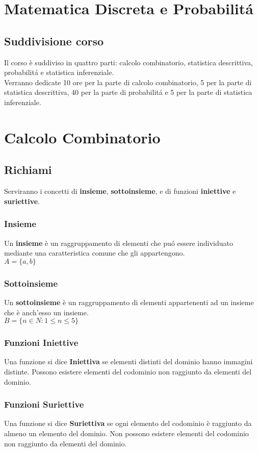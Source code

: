 \documentclass[11pt]{article}
\begin{document}
    \section*{\huge \centering Matematica Discreta e Probabilit\'a }
     \subsection*{Suddivisione corso} 
        Il corso \`e suddiviso in quattro parti: calcolo combinatorio,
        statistica descrittiva, probabilit\'a e statistica inferenziale. \\
        Verranno dedicate 10 ore per la parte di calcolo combinatorio, 5 
        per la parte di statistica descrittiva, 40 per la parte di probabilit\'a e 5 per la parte di statistica inferenziale.
   
   \section{Calcolo Combinatorio}
    \subsection{Richiami}
        Serviranno i concetti di \textbf{insieme},\textbf{ sottoinsieme}, e di funzioni \textbf{iniettive} e \textbf{suriettive}.
        \subsubsection{Insieme}
            Un \textbf{insieme} \`e un raggruppamento di elementi che pu\'o essere individuato mediante una caratteristica comune che gli appartengono.\\
            $A=\{a,b\}$
        \subsubsection{Sottoinsieme}
            Un \textbf{sottoinsieme} \`e un raggruppamento di elementi appartenenti ad un insieme che \`e anch'esso un insieme.\\
            $B=\{n \in N : 1\leq n \leq 5 \} $ 
        \subsubsection{Funzioni Iniettive}
            Una funzione si dice \textbf{Iniettiva} se elementi distinti del dominio hanno immagini distinte. Possono esistere elementi del codominio non raggiunto da elementi del dominio.
        \subsubsection{Funzioni Suriettive}
            Una funzione si dice \textbf{Suriettiva} se ogni elemento del codominio \`e raggiunto da almeno un elemento del dominio. Non possono esistere elementi del codominio non raggiunto da elementi del dominio.
\end{document}

